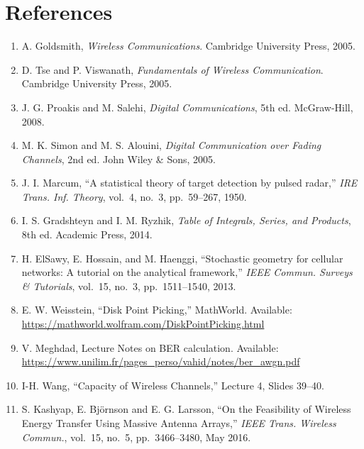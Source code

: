 \documentclass[12pt,a4paper]{article}
\begin{document}
\section*{References}
\begin{enumerate}
    \item A. Goldsmith, \textit{Wireless Communications}. Cambridge University Press, 2005.
    \item D. Tse and P. Viswanath, \textit{Fundamentals of Wireless Communication}. Cambridge University Press, 2005.
    \item J. G. Proakis and M. Salehi, \textit{Digital Communications}, 5th ed. McGraw-Hill, 2008.
    \item M. K. Simon and M. S. Alouini, \textit{Digital Communication over Fading Channels}, 2nd ed. John Wiley \& Sons, 2005.
    \item J. I. Marcum, ``A statistical theory of target detection by pulsed radar,'' \textit{IRE Trans. Inf. Theory}, vol.~4, no.~3, pp.~59--267, 1950.
    \item I. S. Gradshteyn and I. M. Ryzhik, \textit{Table of Integrals, Series, and Products}, 8th ed. Academic Press, 2014.
    \item H. ElSawy, E. Hossain, and M. Haenggi, ``Stochastic geometry for cellular networks: A tutorial on the analytical framework,'' \textit{IEEE Commun. Surveys \& Tutorials}, vol.~15, no.~3, pp.~1511--1540, 2013.
    \item E. W. Weisstein, ``Disk Point Picking,'' MathWorld. Available: \url{https://mathworld.wolfram.com/DiskPointPicking.html}
    \item V. Meghdad, Lecture Notes on BER calculation. Available: \url{https://www.unilim.fr/pages_perso/vahid/notes/ber_awgn.pdf}
    \item I-H. Wang, ``Capacity of Wireless Channels,'' Lecture 4, Slides 39--40.
    \item S. Kashyap, E. Bj\"ornson and E. G. Larsson, ``On the Feasibility of Wireless Energy Transfer Using Massive Antenna Arrays,'' \textit{IEEE Trans. Wireless Commun.}, vol.~15, no.~5, pp.~3466--3480, May 2016.
\end{enumerate}
\end{document}
